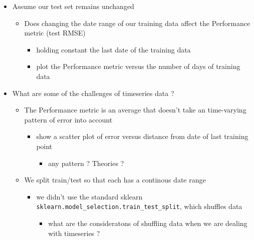 \documentclass[11pt]{article}
\providecommand{\tightlist}{%
      \setlength{\itemsep}{0pt}\setlength{\parskip}{0pt}}
\begin{document}
    \begin{itemize}
\tightlist
\item
  Assume our test set remains unchanged

  \begin{itemize}
  \tightlist
  \item
    Does changing the date range of our training data affect the
    Performance metric (test RMSE)

    \begin{itemize}
    \tightlist
    \item
      holding constant the last date of the training data
    \item
      plot the Performance metric versus the number of days of training
      data
    \end{itemize}
  \end{itemize}
\item
  What are some of the challenges of timeseries data ?

  \begin{itemize}
  \tightlist
  \item
    The Performance metric is an average that doesn't take an
    time-varying pattern of error into account

    \begin{itemize}
    \tightlist
    \item
      show a scatter plot of error versus distance from date of last
      training point

      \begin{itemize}
      \tightlist
      \item
        any pattern ? Theories ?
      \end{itemize}
    \end{itemize}
  \item
    We split train/test so that each has a continous date range

    \begin{itemize}
    \tightlist
    \item
      we didn't use the standard sklearn
      \texttt{sklearn.model\_selection.train\_test\_split}, which
      shuffles data

      \begin{itemize}
      \tightlist
      \item
        what are the consideratons of shuffling data when we are dealing
        with timeseries ?
      \end{itemize}
    \end{itemize}
  \end{itemize}
\end{itemize}
\end{document}

